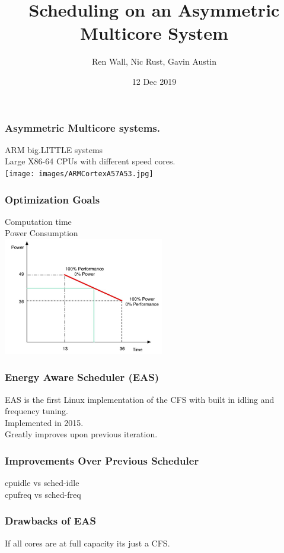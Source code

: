 \documentclass{beamer}
\title{Scheduling on an Asymmetric Multicore System}
\author{Ren Wall, Nic Rust, Gavin Austin}
\institute{}
\date{12 Dec 2019}
\begin{document}
	\frame{\titlepage}
	
	\begin{frame}
		\frametitle{Asymmetric Multicore systems.}
		ARM big.LITTLE systems\\
		Large X86-64 CPUs with different speed cores.\\
		\texttt{[image: images/ARMCortexA57A53.jpg]}
	\end{frame}
	
	\begin{frame}
		\frametitle{Optimization Goals \cite{AAP2013}}
		Computation time\\
		Power Consumption\\
		\includegraphics[width=7cm]{images/power_vs_performance.jpg}
	\end{frame}
	
	\begin{frame}
		\frametitle{Energy Aware Scheduler (EAS)\cite{EAS2015}}
		EAS is the first Linux implementation of the CFS with built in idling and frequency tuning.\\
		Implemented in 2015.\\
		Greatly improves upon previous iteration.\\
		\cite{EASp2015}
	\end{frame}
	
	\begin{frame}
		\frametitle{Improvements Over Previous Scheduler\cite{EASp2015}}
		cpuidle vs sched-idle\\
		cpufreq vs sched-freq\\
	\end{frame}
	
	\begin{frame}
		\frametitle{Drawbacks of EAS}
		If all cores are at full capacity its just a CFS.
	\end{frame}
	
\end{document}
